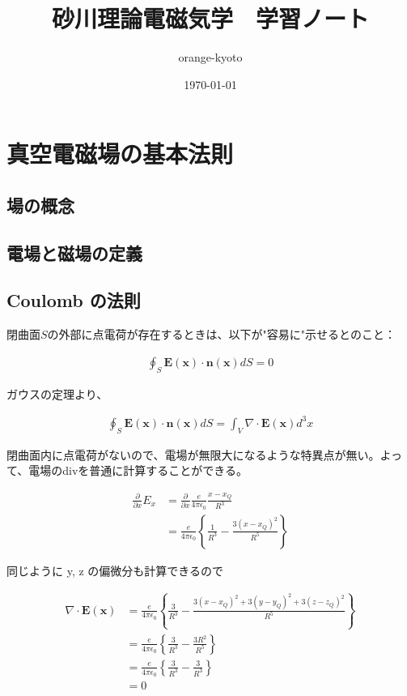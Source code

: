 \documentclass[a4j,12pt,uplatex,dvipdfmx]{jsreport}
\title{砂川理論電磁気学　学習ノート}
\author{orange-kyoto}
\date{\today}
\begin{document}
\maketitle

\tableofcontents
\clearpage

\chapter{真空電磁場の基本法則}

\section{場の概念}

\section{電場と磁場の定義}

\section{Coulomb の法則}

閉曲面$S$の外部に点電荷が存在するときは、以下が"容易に"示せるとのこと：

\begin{align*}
  \oint_{S} \bm{E}(\bm{x}) \cdot \bm{n}(\bm{x}) dS = 0
\end{align*}

ガウスの定理より、

\begin{align*}
  \oint_{S} \bm{E}(\bm{x}) \cdot \bm{n}(\bm{x}) dS = \int_{V} \nabla \cdot \bm{E}(\bm{x}) d^3 x
\end{align*}

閉曲面内に点電荷がないので、電場が無限大になるような特異点が無い。よって、電場のdivを普通に計算することができる。

\begin{align*}
  \frac{\partial}{\partial x} E_{x}
  &= \frac{\partial}{\partial x} \frac{e}{4 \pi \epsilon_0} \frac{x - x_{Q}}{R^3} \\
  &= \frac{e}{4 \pi \epsilon_0} \left\{ \frac{1}{R^3} - \frac{3 ( x - x_{Q} )^2}{R^5} \right\}
\end{align*}

同じように y, z の偏微分も計算できるので

\begin{align*}
  \nabla \cdot \bm{E}(\bm{x})
  &= \frac{e}{4 \pi \epsilon_0} \left\{ \frac{3}{R^3} - \frac{3 ( x - x_{Q} )^2 + 3 ( y - y_{Q} )^2 + 3 ( z - z_{Q} )^2}{R^5} \right\} \\
  &= \frac{e}{4 \pi \epsilon_0} \left\{ \frac{3}{R^3} - \frac{3 R^2}{R^5} \right\} \\
  &= \frac{e}{4 \pi \epsilon_0} \left\{ \frac{3}{R^3} - \frac{3}{R^3} \right\} \\
  &= 0
\end{align*}
\end{document}
